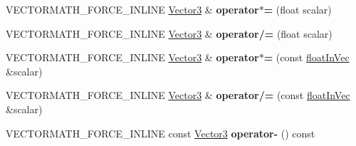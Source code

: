 \begin{DoxyCompactItemize}
\item 
\mbox{\label{classVectormath_1_1Aos_1_1Vector3_a6e6f042308c5088cbdf3d30c24a9e80f}} 
V\+E\+C\+T\+O\+R\+M\+A\+T\+H\+\_\+\+F\+O\+R\+C\+E\+\_\+\+I\+N\+L\+I\+NE \hyperlink{classVectormath_1_1Aos_1_1Vector3}{Vector3} \& {\bfseries operator$\ast$=} (float scalar)
\item 
\mbox{\label{classVectormath_1_1Aos_1_1Vector3_a3a36769bd188e8c1065a390a1c1a8118}} 
V\+E\+C\+T\+O\+R\+M\+A\+T\+H\+\_\+\+F\+O\+R\+C\+E\+\_\+\+I\+N\+L\+I\+NE \hyperlink{classVectormath_1_1Aos_1_1Vector3}{Vector3} \& {\bfseries operator/=} (float scalar)
\item 
\mbox{\label{classVectormath_1_1Aos_1_1Vector3_aff40e01dbd0cb020c62b2ccc4bc1e4f7}} 
V\+E\+C\+T\+O\+R\+M\+A\+T\+H\+\_\+\+F\+O\+R\+C\+E\+\_\+\+I\+N\+L\+I\+NE \hyperlink{classVectormath_1_1Aos_1_1Vector3}{Vector3} \& {\bfseries operator$\ast$=} (const \hyperlink{classVectormath_1_1floatInVec}{float\+In\+Vec} \&scalar)
\item 
\mbox{\label{classVectormath_1_1Aos_1_1Vector3_a008e37aae5349073b45b6592d72e545e}} 
V\+E\+C\+T\+O\+R\+M\+A\+T\+H\+\_\+\+F\+O\+R\+C\+E\+\_\+\+I\+N\+L\+I\+NE \hyperlink{classVectormath_1_1Aos_1_1Vector3}{Vector3} \& {\bfseries operator/=} (const \hyperlink{classVectormath_1_1floatInVec}{float\+In\+Vec} \&scalar)
\item 
\mbox{\label{classVectormath_1_1Aos_1_1Vector3_ae8806ad886e1b54d12a8facf85bdc180}} 
V\+E\+C\+T\+O\+R\+M\+A\+T\+H\+\_\+\+F\+O\+R\+C\+E\+\_\+\+I\+N\+L\+I\+NE const \hyperlink{classVectormath_1_1Aos_1_1Vector3}{Vector3} {\bfseries operator-\/} () const
\end{DoxyCompactItemize}
